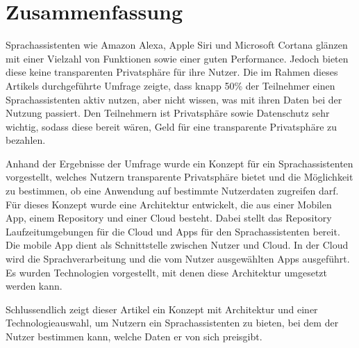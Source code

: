\section{Zusammenfassung}
Sprachassistenten wie Amazon Alexa, Apple Siri und Microsoft Cortana glänzen mit einer Vielzahl von Funktionen sowie einer guten Performance. Jedoch bieten diese keine transparenten Privatsphäre für ihre Nutzer. Die im Rahmen dieses Artikels durchgeführte Umfrage zeigte, dass knapp 50\% der Teilnehmer einen Sprachassistenten aktiv nutzen, aber nicht wissen, was mit ihren Daten bei der Nutzung passiert. Den Teilnehmern ist Privatsphäre sowie Datenschutz sehr wichtig, sodass diese bereit wären, Geld für eine transparente Privatsphäre zu bezahlen. 

Anhand der Ergebnisse der Umfrage wurde ein Konzept für ein Sprachassistenten vorgestellt, welches Nutzern transparente Privatsphäre bietet und die Möglichkeit zu bestimmen, ob eine Anwendung auf bestimmte Nutzerdaten zugreifen darf. Für dieses Konzept wurde eine Architektur entwickelt, die aus einer Mobilen App, einem Repository und einer Cloud besteht. Dabei stellt das Repository Laufzeitumgebungen für die Cloud und Apps für den Sprachassistenten bereit. Die mobile App dient als Schnittstelle zwischen Nutzer und Cloud. In der Cloud wird die Sprachverarbeitung und die vom Nutzer ausgewählten Apps ausgeführt. Es wurden Technologien vorgestellt, mit denen diese Architektur umgesetzt werden kann. 

Schlussendlich zeigt dieser Artikel ein Konzept mit Architektur und einer Technologieauswahl, um Nutzern ein Sprachassistenten zu bieten, bei dem der Nutzer bestimmen kann, welche Daten er von sich preisgibt. 




